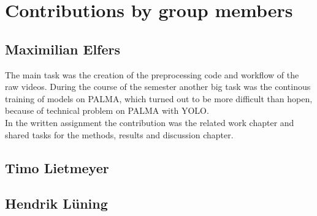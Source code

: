 \chapter{Contributions by group members}
\label{ch:contributions}


\section{Maximilian Elfers}

The main task was the creation of the preprocessing code and workflow of the raw videos. During the course of the semester another big task was the continous training of models on PALMA, which turned out to be more difficult than hopen, because of technical problem on PALMA with YOLO. \\
In the written assignment the contribution was the related work chapter and shared tasks for the methods, results and discussion chapter.

\section{Timo Lietmeyer}

\section{Hendrik Lüning}
